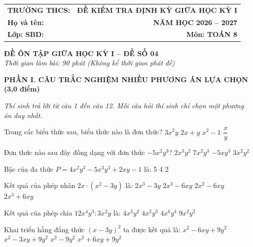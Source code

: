 \documentclass[12pt,a4paper]{article}
\begin{document}
\noindent
\begin{tabularx}{\linewidth}{X r}
\textbf{TRƯỜNG THCS: \dotfill} & \textbf{ĐỀ KIỂM TRA ĐỊNH KỲ GIỮA HỌC KỲ I} \\
\textbf{Họ và tên: \dotfill} & \textbf{NĂM HỌC 2026 -- 2027} \\
\textbf{Lớp: \dotfill \quad SBD: \dotfill} & \textbf{Môn: TOÁN 8} \\
\hline
\end{tabularx}
\vspace{2mm}

\begin{center}
  \textbf{\large ĐỀ ÔN TẬP GIỮA HỌC KỲ I -- ĐỀ SỐ 04}\\
  \textit{Thời gian làm bài: 90 phút (Không kể thời gian phát đề)}
\end{center}
\vspace{1mm}

\noindent\textbf{\large PHẦN I. CÂU TRẮC NGHIỆM NHIỀU PHƯƠNG ÁN LỰA CHỌN (3,0 điểm)}

\textit{Thí sinh trả lời từ câu 1 đến câu 12. Mỗi câu hỏi thí sinh chỉ chọn một phương án duy nhất.}

\vspace{1mm}
\begin{ex}
Trong các biểu thức sau, biểu thức nào là đơn thức?
\choice
{\True $3x^2y$}
{$2x + y$}
{$x^2 - 1$}
{$\dfrac{x}{y}$}
\end{ex}

\begin{ex}
Đơn thức nào sau đây đồng dạng với đơn thức $-5x^2y^3$?
\choice
{$2x^3y^2$}
{\True $7x^2y^3$}
{$-5xy^3$}
{$3x^2y^2$}
\end{ex}

\begin{ex}
Bậc của đa thức $P = 4x^2y^3 - 5x^3y^3 + 2xy - 1$ là:
\choice
{5}
{}
{4}
{2}
\end{ex}

\begin{ex}
Kết quả của phép nhân $2x \cdot (x^2 - 3y)$ là:
\choice
{$2x^3 - 3y$}
{\True $2x^3 - 6xy$}
{$2x^2 - 6xy$}
{$2x^3 + 6xy$}
\end{ex}

\begin{ex}
Kết quả của phép chia $12x^4y^3 : 3x^2y$ là:
\choice
{\True $4x^2y^2$}
{$4x^2y^3$}
{$4x^6y^4$}
{$9x^2y^2$}
\end{ex}

\begin{ex}
Khai triển hằng đẳng thức $(x - 3y)^2$ ta được kết quả là:
\choice
{\True $x^2 - 6xy + 9y^2$}
{$x^2 - 3xy + 9y^2$}
{$x^2 - 9y^2$}
{$x^2 + 6xy + 9y^2$}
\end{ex}
\end{document}
